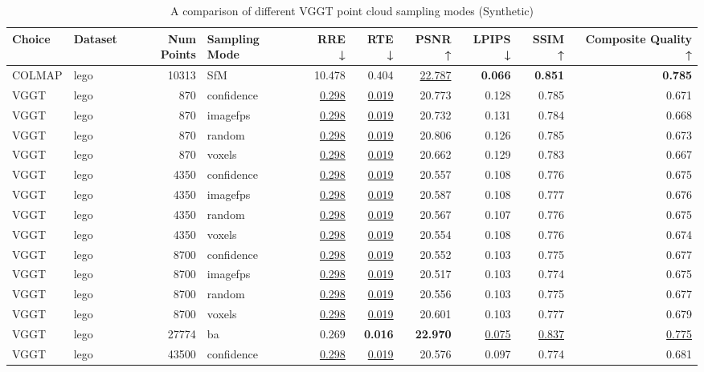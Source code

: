 \begin{table}[H]
\caption{\ifdefined\customcaption \customcaption \else A comparison of different VGGT point cloud sampling modes (Synthetic) \fi}
\label{tab:03_sampling_mode_synthetic}
\centering
\tiny
\begin{tabular}{llrlrrrrrr}
\toprule
Choice & Dataset & Num Points & Sampling Mode & RRE ↓ & RTE ↓ & PSNR ↑ & LPIPS ↓ & SSIM ↑ & Composite Quality ↑ \\
\midrule
COLMAP & lego & 10313 & SfM & 10.478 & 0.404 & \underline{22.787} & \textbf{0.066} & \textbf{0.851} & \textbf{0.785} \\
VGGT & lego & 870 & confidence & \underline{0.298} & \underline{0.019} & 20.773 & 0.128 & 0.785 & 0.671 \\
VGGT & lego & 870 & imagefps & \underline{0.298} & \underline{0.019} & 20.732 & 0.131 & 0.784 & 0.668 \\
VGGT & lego & 870 & random & \underline{0.298} & \underline{0.019} & 20.806 & 0.126 & 0.785 & 0.673 \\
VGGT & lego & 870 & voxels & \underline{0.298} & \underline{0.019} & 20.662 & 0.129 & 0.783 & 0.667 \\
VGGT & lego & 4350 & confidence & \underline{0.298} & \underline{0.019} & 20.557 & 0.108 & 0.776 & 0.675 \\
VGGT & lego & 4350 & imagefps & \underline{0.298} & \underline{0.019} & 20.587 & 0.108 & 0.777 & 0.676 \\
VGGT & lego & 4350 & random & \underline{0.298} & \underline{0.019} & 20.567 & 0.107 & 0.776 & 0.675 \\
VGGT & lego & 4350 & voxels & \underline{0.298} & \underline{0.019} & 20.554 & 0.108 & 0.776 & 0.674 \\
VGGT & lego & 8700 & confidence & \underline{0.298} & \underline{0.019} & 20.552 & 0.103 & 0.775 & 0.677 \\
VGGT & lego & 8700 & imagefps & \underline{0.298} & \underline{0.019} & 20.517 & 0.103 & 0.774 & 0.675 \\
VGGT & lego & 8700 & random & \underline{0.298} & \underline{0.019} & 20.556 & 0.103 & 0.775 & 0.677 \\
VGGT & lego & 8700 & voxels & \underline{0.298} & \underline{0.019} & 20.601 & 0.103 & 0.777 & 0.679 \\
VGGT & lego & 27774 & ba & 0.269 & \textbf{0.016} & \textbf{22.970} & \underline{0.075} & \underline{0.837} & \underline{0.775} \\
VGGT & lego & 43500 & confidence & \underline{0.298} & \underline{0.019} & 20.576 & 0.097 & 0.774 & 0.681 \\

\end{tabular}
\end{table}
